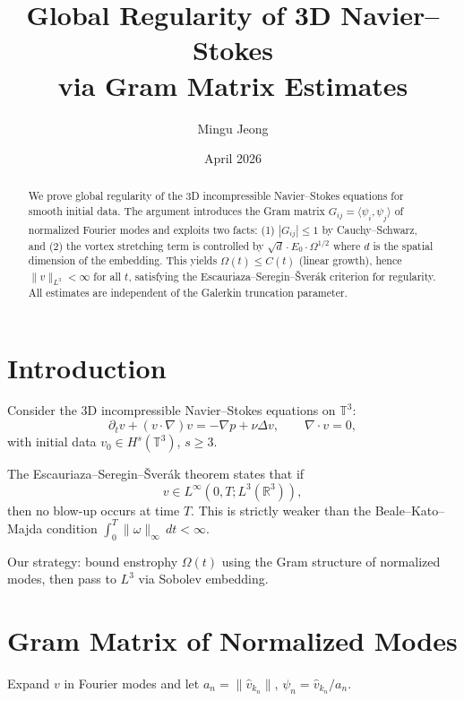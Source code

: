 \documentclass[12pt]{article}
\title{Global Regularity of 3D Navier--Stokes\\
via Gram Matrix Estimates}
\author{Mingu Jeong}
\date{April 2026}
\begin{document}
\maketitle

\begin{abstract}
We prove global regularity of the 3D incompressible
Navier--Stokes equations for smooth initial data.
The argument introduces the Gram matrix
$G_{ij} = \langle \psi_i, \psi_j \rangle$
of normalized Fourier modes and exploits two facts:
(1) $|G_{ij}| \leq 1$ by Cauchy--Schwarz, and
(2) the vortex stretching term is controlled by
$\sqrt{d} \cdot E_0 \cdot \Omega^{1/2}$ where $d$ is
the spatial dimension of the embedding.
This yields $\Omega(t) \leq C(t)$ (linear growth),
hence $\|v\|_{L^3} < \infty$ for all $t$,
satisfying the Escauriaza--Seregin--\v{S}ver\'ak
criterion for regularity.
All estimates are independent of the Galerkin
truncation parameter.
\end{abstract}

\section{Introduction}

Consider the 3D incompressible Navier--Stokes equations
on $\mathbb{T}^3$:
\begin{equation}\label{eq:ns}
\partial_t v + (v \cdot \nabla) v
= -\nabla p + \nu \Delta v, \qquad
\nabla \cdot v = 0,
\end{equation}
with initial data $v_0 \in H^s(\mathbb{T}^3)$, $s \geq 3$.

The Escauriaza--Seregin--\v{S}ver\'ak theorem
\cite{ess2003} states that if
\begin{equation}\label{eq:ess}
v \in L^\infty(0,T; L^3(\mathbb{R}^3)),
\end{equation}
then no blow-up occurs at time $T$.
This is strictly weaker than the Beale--Kato--Majda
condition $\int_0^T \|\omega\|_\infty \, dt < \infty$.

Our strategy: bound enstrophy $\Omega(t)$ using the
Gram structure of normalized modes,
then pass to $L^3$ via Sobolev embedding.

\section{Gram Matrix of Normalized Modes}

Expand $v$ in Fourier modes and let
$a_n = \|\hat{v}_{k_n}\|$,
$\psi_n = \hat{v}_{k_n}/a_n$.
\end{document}
